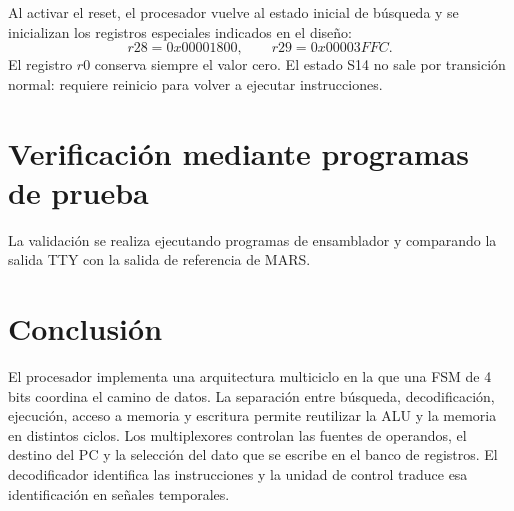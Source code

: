 \documentclass[11pt,a4paper]{article}
\begin{document}
Al activar el reset, el procesador vuelve al estado inicial de búsqueda y se inicializan los registros especiales indicados en el diseño:
\[
    r28 = 0x00001800,\qquad r29 = 0x00003FFC.
\]
El registro $r0$ conserva siempre el valor cero. El estado S14 no sale por transición normal: requiere reinicio para volver a ejecutar instrucciones.

\section{Verificación mediante programas de prueba}

La validación se realiza ejecutando programas de ensamblador y comparando la salida TTY con la salida de referencia de MARS.

\section{Conclusión}

El procesador implementa una arquitectura multiciclo en la que una FSM de 4 bits coordina el camino de datos. La separación entre búsqueda, decodificación, ejecución, acceso a memoria y escritura permite reutilizar la ALU y la memoria en distintos ciclos. Los multiplexores controlan las fuentes de operandos, el destino del PC y la selección del dato que se escribe en el banco de registros. El decodificador identifica las instrucciones y la unidad de control traduce esa identificación en señales temporales.
\end{document}
